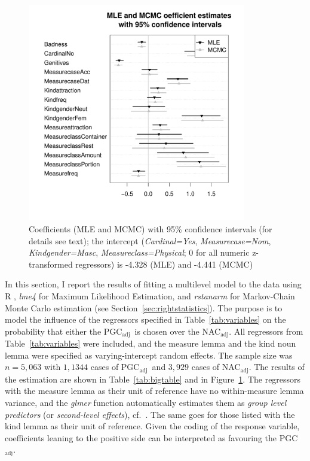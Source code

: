 \documentclass[USenglish]{article}
\newcommand{\Sub}[1]{\ensuremath{\mathrm{_{#1}}}}
\newcommand{\NACa}{NAC\Sub{adj}}
\newcommand{\PGCa}{PGC\Sub{adj}}
\begin{document}
\begin{figure}[hb!]
  \centering
  \includegraphics[width=0.85\textwidth]{../R/output/corpus_fixeffs_mle+mcmc}
  \caption{Coefficients (MLE and MCMC) with 95\% confidence intervals (for details see text); the intercept (\textit{Cardinal=Yes}, \textit{Measurecase=Nom}, \textit{Kindgender=Masc}, \textit{Measureclass=Physical}; 0 for all numeric z-transformed regressors) is -4.328 (MLE) and -4.441 (MCMC)}
  \label{fig:fixeffs}
\end{figure}

In this section, I report the results of fitting a multilevel model to the data using R \citep{R}, \textit{lme4} \citep{lme4} for Maximum Likelihood Estimation, and \textit{rstanarm} \citep{rstanarm} for Markov-Chain Monte Carlo estimation (see Section~\ref{sec:rightstatistics}).
The purpose is to model the influence of the regressors specified in Table~\ref{tab:variables} on the probability that either the \PGCa\ is chosen over the \NACa.
All regressors from Table~\ref{tab:variables} were included, and the measure lemma and the kind noun lemma were specified as varying-intercept random effects.
The sample size was $n=5,063$ with $1,1344$ cases of \PGCa\ and $3,929$ cases of \NACa.
The results of the estimation are shown in Table~\ref{tab:bigtable} and in Figure~\ref{fig:fixeffs}.
The regressors with the measure lemma as their unit of reference have no within-measure lemma variance, and the \textit{glmer} function automatically estimates them as \textit{group level predictors} (or \textit{second-level effects}), cf.\ \cite[265--269,302--304]{GelmanHill2006}.
The same goes for those listed with the kind lemma as their unit of reference.
Given the coding of the response variable, coefficients leaning to the positive side can be interpreted as favouring the \PGCa.
\end{document}
